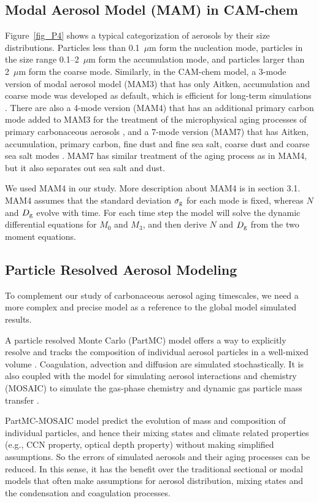 \documentclass[12pt, fullpage]{uiucthesis2009}
\begin{document}
		\subsection{Modal Aerosol Model (MAM) in CAM-chem}
		Figure~\ref{fig_P4} shows a typical categorization of aerosols by their size distributions. Particles less than 0.1~$\mu$m form the nucleation mode, particles in the size range 0.1--2~$\mu$m form the accumulation mode, and particles larger than 2~$\mu$m form the coarse mode. Similarly, in the CAM-chem model, a 3-mode version of modal aerosol model (MAM3) that has only Aitken, accumulation and coarse mode was developed as default, which is efficient for long-term simulations \citep{Liu2012}. There are also a 4-mode version (MAM4) that has an additional primary carbon mode added to MAM3 for the treatment of the microphysical aging processes of primary carbonaceous aerosols \citep{Liu2016}, and a 7-mode version (MAM7) that has Aitken, accumulation, primary carbon, fine dust and fine sea salt, coarse dust and coarse sea salt modes \citep{Liu2012}. MAM7 has similar treatment of the aging process as in MAM4, but it also separates out sea salt and dust.
		
		We used MAM4 in our study. More description about MAM4 is in section 3.1. MAM4 assumes that the standard deviation $\sigma_{\rm g}$ for each mode is fixed, whereas $N$ and $D_{\rm g}$ evolve with time. For each time step the model will solve the dynamic differential equations for $M_0$ and $M_3$, and then derive $N$ and $D_{\rm g}$ from the two moment equations.
		
		\subsection{Particle Resolved Aerosol Modeling}
		To complement our study of carbonaceous aerosol aging timescales, we need a more complex and precise model as a reference to the global model simulated results. 
		
		A particle resolved Monte Carlo (PartMC) model offers a way to explicitly resolve and tracks the composition of individual aerosol particles in a well-mixed volume \citep{riemer2009simulating}. Coagulation, advection and diffusion are simulated stochastically. It is also coupled with the model for simulating aerosol interactions and chemistry (MOSAIC) to simulate the gas-phase chemistry and dynamic gas particle mass transfer \citep{zaveri2008model}. 
		
		PartMC-MOSAIC model predict the evolution of mass and composition of individual particles, and hence their mixing states and climate related properties (e.g., CCN property, optical depth property) without making simplified assumptions. So the errors of simulated aerosols and their aging processes can be reduced. In this sense, it has the benefit over the traditional sectional or modal models that often make assumptions for aerosol distribution, mixing states and the condensation and coagulation processes.
		
\end{document}
